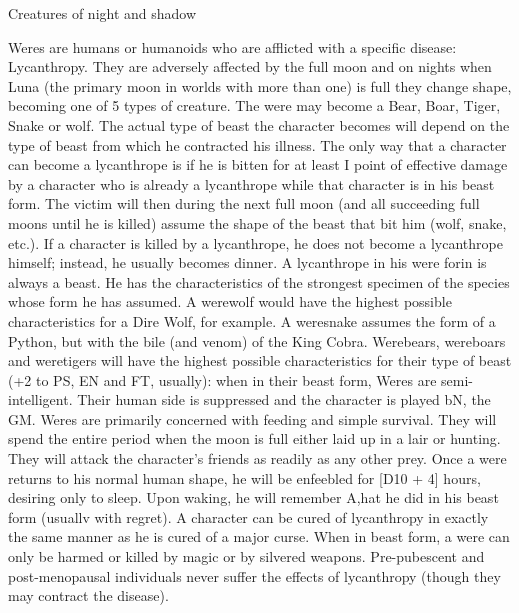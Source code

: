 \begin{mmgroup}{Creatures of night and shadow}
\begin{mmcomment}
 Weres are humans or humanoids who are afflicted with a
specific disease: Lycanthropy. They are adversely affected by the full
moon and on nights when Luna (the primary moon in worlds with more
than one) is full they change shape, becoming one of 5 types of
creature. The were may become a Bear, Boar, Tiger, Snake or wolf. The
actual type of beast the character becomes will depend on the type of
beast from which he contracted his illness. The only way that a
character can become a lycanthrope is if he is bitten for at least I
point of effective damage by a character who is already a lycanthrope
while that character is in his beast form. The victim will then during
the next full moon (and all succeeding full moons until he is killed)
assume the shape of the beast that bit him (wolf, snake, etc.). If a
character is killed by a lycanthrope, he does not become a lycanthrope
himself; instead, he usually becomes dinner.  A lycanthrope in his
were forin is always a beast. He has the characteristics of the
strongest specimen of the species whose form he has assumed. A
werewolf would have the highest possible characteristics for a Dire
Wolf, for example. A weresnake assumes the form of a Python, but with
the bile (and venom) of the King Cobra. Werebears, wereboars and
weretigers will have the highest possible characteristics for their
type of beast (+2 to PS, EN and FT, usually): when in their beast
form, Weres are semi-intelligent. Their human side is suppressed and
the character is played bN, the GM. Weres are primarily concerned
with feeding and simple survival. They will spend the entire period
when the moon is full either laid up in a lair or hunting. They will
attack the character's friends as readily as any other prey.  Once a
were returns to his normal human shape, he will be enfeebled for [D10 +
4] hours, desiring only to sleep. Upon waking, he will remember A,hat
he did in his beast form (usuallv with regret).  A character can be
cured of lycanthropy in exactly the same manner as he is cured of a
major curse.  When in beast form, a were can only be harmed or killed
by magic or by silvered weapons.  Pre-pubescent and post-menopausal
individuals never suffer the effects of lycanthropy (though they may
contract the disease).

\end{mmcomment}
\end{mmgroup}

